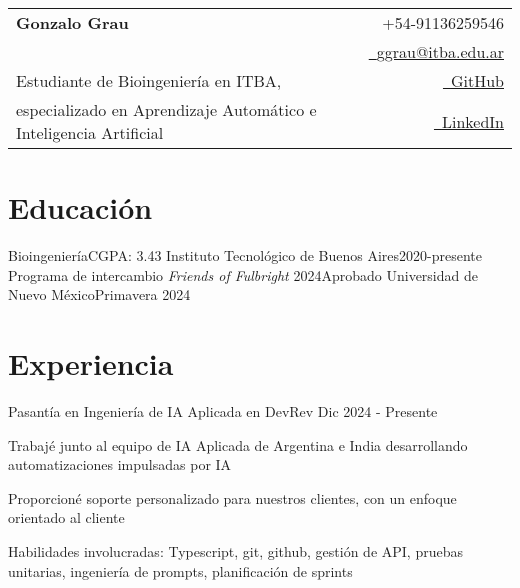
\newcommand{\name}{Gonzalo Grau} %
\newcommand{\course}{Bioingeniería} %
\newcommand{\phone}{91136259546} %
\newcommand{\emaila}{ggrau@itba.edu.ar} %


\selectfont

{
\begin{tabularx}{\linewidth}{L r} \\
  \textbf{\Huge \name} & {\raisebox{0.0\height}{\footnotesize \faPhone}\ +54-\phone}\\
  & \href{mailto:\emaila}{\raisebox{0.0\height}{\footnotesize \faEnvelope}\ {\emaila}} \\
 Estudiante de Bioingeniería en ITBA, & \href{https://github.com/gonzagrau}{\raisebox{0.0\height}{\footnotesize \faGithub}\ {GitHub}} \\
   especializado en Aprendizaje Automático e Inteligencia Artificial & \href{https://www.linkedin.com/in/gonzalo-grau/}{\raisebox{0.0\height}{\footnotesize \faLinkedin}\ {LinkedIn}}
\end{tabularx}
}


\vspace{-5.0mm}
\section{\textbf{Educación}}
  \resumeSubHeadingListStart
    \resumeSubheading
      {Bioingeniería}{CGPA: 3.43}
      {Instituto Tecnológico de Buenos Aires}{2020-presente}
    \resumeSubheading
      {Programa de intercambio \textit{Friends of Fulbright} 2024}{Aprobado}
      {Universidad de Nuevo México}{Primavera 2024}
   \resumeSubHeadingListEnd

\vspace{-5.0mm}
\section{\textbf{Experiencia}}
  \resumeSubHeadingListStart
    \resumeSubheading
    {Pasantía en Ingeniería de IA Aplicada en DevRev}
    {}{}{Dic 2024 - Presente}
      \vspace{-5mm}
      \resumeItemListStart
    \item { Trabajé junto al equipo de IA Aplicada de Argentina e India desarrollando automatizaciones impulsadas por IA }
    \item { Proporcioné soporte personalizado para nuestros clientes, con un enfoque orientado al cliente }
    \item { Habilidades involucradas: Typescript, git, github, gestión de API, pruebas unitarias, ingeniería de prompts, planificación de sprints}
    \resumeItemListEnd

